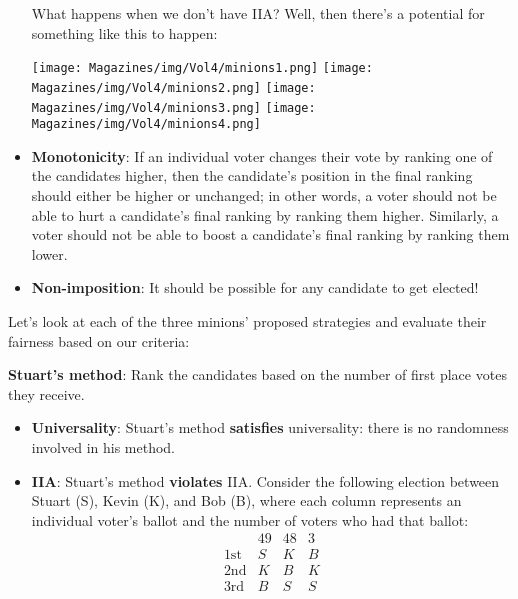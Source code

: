 \documentclass{article}
\begin{document}
\begin{multicols}{3}
\begin{itemize}
What happens when we don’t have IIA? Well, then there’s a potential for something like this to happen:
	\begin{center}
	    \texttt{[image: Magazines/img/Vol4/minions1.png]}
	    \texttt{[image: Magazines/img/Vol4/minions2.png]}
	    \texttt{[image: Magazines/img/Vol4/minions3.png]}
	    \texttt{[image: Magazines/img/Vol4/minions4.png]}
	\end{center}
	
	
	\item \textbf{Monotonicity}: If an individual voter changes their vote by ranking one of the candidates higher, then the candidate’s position in the final ranking should either be higher or unchanged; in other words, a voter should not be able to hurt a candidate’s final ranking by ranking them higher. Similarly, a voter should not be able to boost a candidate’s final ranking by ranking them lower. 
	\item \textbf{Non-imposition}: It should be possible for any candidate to get elected! 
\end{itemize}

Let’s look at each of the three minions’ proposed strategies and evaluate their fairness based on our criteria:

\textbf{Stuart’s method}: Rank the candidates based on the number of first place votes they receive.
\begin{itemize}
	\item \textbf{Universality}: Stuart’s method {\textbf{satisfies}} universality: there is no randomness involved in his method.
	\item \textbf{IIA}: Stuart’s method {\textbf{violates}} IIA. Consider the following election between Stuart (S), Kevin (K), and Bob (B), where each column represents an individual voter’s ballot and the number of voters who had that ballot:
	\[
		\begin{array}{c|ccc}
				& 49 & 48 & 3 \\
			\text{1st} & S & K & B \\
			\text{2nd} & K & B & K \\
			\text{3rd} & B & S & S
		\end{array}
	\]


\end{itemize}
\end{multicols}
\end{document}
